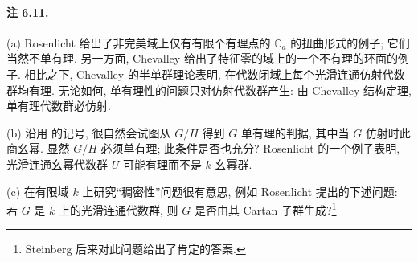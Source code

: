 

\paragraph{\textbf{注 6.11.}}
\textup{(a)} Rosenlicht 给出了非完美域上仅有有限个有理点的 \(\mathbb G_a\) 的扭曲形式的例子; 它们当然不单有理. 另一方面, Chevalley 给出了特征零的域上的一个不有理的环面的例子. 相比之下, Chevalley 的半单群理论表明, 在代数闭域上每个光滑连通仿射代数群均有理. 无论如何, 单有理性的问题只对仿射代数群产生: 由 Chevalley 结构定理, 单有理代数群必仿射.

\textup{(b)} 沿用  的记号, 很自然会试图从 \(G/H\) 得到 \(G\) 单有理的判据, 其中当 \(G\) 仿射时此商幺幂. 显然 \(G/H\) 必须单有理; 此条件是否也充分? Rosenlicht 的一个例子表明, 光滑连通幺幂代数群 \(U\) 可能有理而不是 \(k\)-幺幂群.

\textup{(c)} 在有限域 \(k\) 上研究“稠密性”问题很有意思, 例如 Rosenlicht 提出的下述问题: 若 \(G\) 是 \(k\) 上的光滑连通代数群, 则 \(G\) 是否由其 Cartan 子群生成?\footnote{Steinberg 后来对此问题给出了肯定的答案.}

